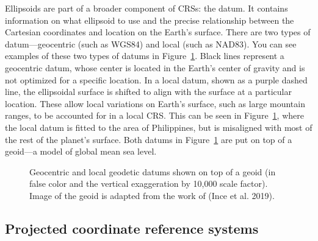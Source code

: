 \documentclass[
  letterpaper,
]{krantz}
\begin{document}
Ellipsoids are part of a broader component of CRSs: the datum. It
contains information on what ellipsoid to use and the precise
relationship between the Cartesian coordinates and location on the
Earth's surface. There are two types of datum---geocentric (such as
WGS84) and local (such as NAD83). You can see examples of these two
types of datums in Figure~\ref{fig-geocentric-vs-local}. Black lines
represent a geocentric datum, whose center is located in the Earth's
center of gravity and is not optimized for a specific location. In a
local datum, shown as a purple dashed line, the ellipsoidal surface is
shifted to align with the surface at a particular location. These allow
local variations on Earth's surface, such as large mountain ranges, to
be accounted for in a local CRS. This can be seen in
Figure~\ref{fig-geocentric-vs-local}, where the local datum is fitted to
the area of Philippines, but is misaligned with most of the rest of the
planet's surface. Both datums in Figure~\ref{fig-geocentric-vs-local}
are put on top of a geoid---a model of global mean sea level.

\begin{figure}


\caption{\label{fig-geocentric-vs-local}Geocentric and local geodetic
datums shown on top of a geoid (in false color and the vertical
exaggeration by 10,000 scale factor). Image of the geoid is adapted from
the work of (Ince et al. 2019).}

\end{figure}%

\subsection{Projected coordinate reference
systems}\label{sec-projected-coordinate-reference-systems}
\end{document}
